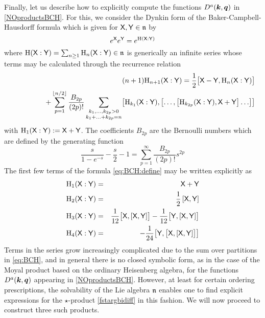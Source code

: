 Finally, let us describe how to explicitly compute the functions $D^a({{\boldsymbol {k} }},{{\boldsymbol {q} }})$
in \eqref{NOproductsBCH}. For this, we consider the Dynkin form of the
Baker-Campbell-Hausdorff formula which is given for ${\sf X},{\sf Y}\in{\mathfrak n}$ by
\begin{equation}
  \label{eq:BCH:define}
  e^{\sf X}  e^{\sf Y}= e^{\mathrm{H}({\sf X}:{\sf Y})}
\end{equation}
where $\mathrm{H}({\sf X}:{\sf Y})=\sum_{n\geq1}\mathrm{H}_n({\sf X}:{\sf Y})\in{\mathfrak n}$ is
generically an infinite series whose terms may be calculated through the
recurrence relation
\begin{eqnarray}
  \label{eq:BCH}
  &&(n+1) \mathrm{H}_{n+1}({\sf X}:{\sf Y}) = \frac 12 \bigl[{\sf X}-{\sf Y} , 
  \mathrm{H}_n({\sf X}:{\sf Y})\bigr] \\\nonumber
  &&\qquad\qquad+\sum_{p=1}^{\lfloor n/2\rfloor}\frac{B_{2p}}{(2p)!} 
  \sum_{\substack{k_1,\ldots,k_{2p}> 0 \\ k_1+\ldots+k_{2p}=n }}
  \bigl[\mathrm{H}_{k_1}({\sf X}:{\sf Y}) , \bigl[ \ldots , \bigl[
  \mathrm{H}_{k_{2p}}({\sf X}:{\sf Y}) , {\sf X}+{\sf Y}\bigr]\ldots\bigr] \bigr]
\end{eqnarray}
with $\mathrm{H}_1({\sf X}:{\sf Y}):={\sf X}+{\sf Y}$. The coefficients $B_{2p}$ are the
Bernoulli numbers which are defined by the generating function
\begin{equation}
  \label{eq:BCH:K}
  \frac{s}{1- e^{-s}}-\frac s2-1=\sum_{p=1}^\infty\frac{B_{2p}}{(2p)!}
   s^{2p}
\end{equation}
The first few terms of the formula \eqref{eq:BCH:define} may be written
explicitly as
\begin{eqnarray}
  \label{eq:BCH:1}
  \mathrm{H}_1({\sf X}:{\sf Y})&=& {\sf X}+{\sf Y} \\\nonumber
  \mathrm{H}_2({\sf X}:{\sf Y})&=&\frac 12 \left[{\sf X},{\sf Y}\right] \\\nonumber
  \mathrm{H}_3({\sf X}:{\sf Y})&=&\frac 1{12} \bigl[{\sf X} , \left[{\sf X},{\sf Y}\right] \bigr]
  -\frac 1{12} \bigl[{\sf Y} , \left[{\sf X},{\sf Y}\right] \bigr] \\\nonumber
  \mathrm{H}_4({\sf X}:{\sf Y})&=& -\frac 1{24} \bigl[{\sf Y} , \bigl[{\sf X}
   , \left[{\sf X},{\sf Y}\right] \bigr] \bigr]
\end{eqnarray}
Terms in the series grow increasingly complicated due to the sum over partitions
in \eqref{eq:BCH}, and in general there is no closed symbolic form, as in the
case of the Moyal product based on the ordinary Heisenberg algebra, for the
functions $D^a({{\boldsymbol {k} }},{{\boldsymbol {q} }})$ appearing in \eqref{NOproductsBCH}. However, at least
for certain ordering prescriptions, the solvability of the Lie algebra ${\mathfrak n}$
enables one to find explicit expressions for the $\star$-product
\eqref{fstargbidiff} in this fashion. We will now proceed to construct three
such products.

